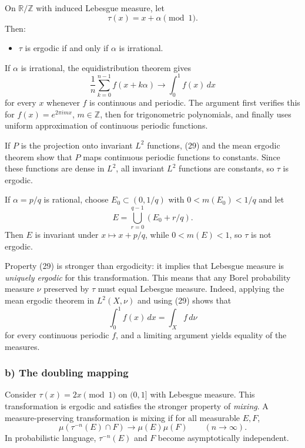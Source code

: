 \documentclass[11pt,openany]{book}
\begin{document}
On $\mathbb R/\mathbb Z$ with induced Lebesgue measure, let
\[
\tau(x)=x+\alpha\pmod1.
\]
Then:
\begin{itemize}
\item $\tau$ is ergodic if and only if $\alpha$ is irrational.
\end{itemize}
If $\alpha$ is irrational, the equidistribution theorem gives
\begin{equation}
\frac1n\sum_{k=0}^{n-1}f(x+k\alpha)
\longrightarrow\int_0^1f(x)\,dx
\tag{29}
\end{equation}
for every $x$ whenever $f$ is continuous and periodic. The argument first verifies this for $f(x)=e^{2\pi imx}$, $m\in\mathbb Z$, then for trigonometric polynomials, and finally uses uniform approximation of continuous periodic functions.

If $P$ is the projection onto invariant $L^2$ functions, (29) and the mean ergodic theorem show that $P$ maps continuous periodic functions to constants. Since these functions are dense in $L^2$, all invariant $L^2$ functions are constants, so $\tau$ is ergodic.

If $\alpha=p/q$ is rational, choose $E_0\subset(0,1/q)$ with $0<m(E_0)<1/q$ and let
\[
E=\bigcup_{r=0}^{q-1}(E_0+r/q).
\]
Then $E$ is invariant under $x\mapsto x+p/q$, while $0<m(E)<1$, so $\tau$ is not ergodic.

Property (29) is stronger than ergodicity: it implies that Lebesgue measure is \emph{uniquely ergodic} for this transformation. This means that any Borel probability measure $\nu$ preserved by $\tau$ must equal Lebesgue measure. Indeed, applying the mean ergodic theorem in $L^2(X,\nu)$ and using (29) shows that
\[
\int_0^1f(x)\,dx=\int_Xf\,d\nu
\]
for every continuous periodic $f$, and a limiting argument yields equality of the measures.

\subsubsection*{b) The doubling mapping}

Consider $\tau(x)=2x\pmod1$ on $(0,1]$ with Lebesgue measure. This transformation is ergodic and satisfies the stronger property of \emph{mixing}. A measure-preserving transformation is mixing if for all measurable $E,F$,
\begin{equation}
\mu(\tau^{-n}(E)\cap F)\longrightarrow\mu(E)\mu(F)
\qquad(n\to\infty).
\tag{30}
\end{equation}
In probabilistic language, $\tau^{-n}(E)$ and $F$ become asymptotically independent.
\end{document}

